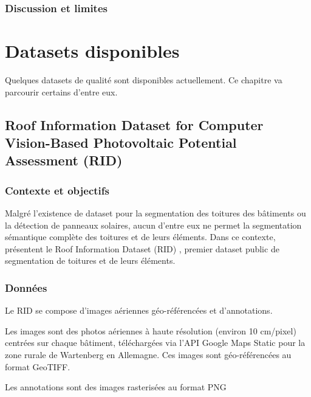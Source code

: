 {{{{\subsubsection{Discussion et limites}


\section{Datasets disponibles}

\par{Quelques datasets de qualité sont disponibles actuellement. Ce chapitre va parcourir certains d'entre eux.}

\subsection{Roof Information Dataset for Computer Vision-Based Photovoltaic Potential Assessment (RID)}
\label{subsec:rid_roof_information_dataset}

\subsubsection{Contexte et objectifs}
\par{Malgré l'existence de dataset pour la segmentation des toitures des bâtiments ou la détection de panneaux solaires, aucun d'entre eux ne permet la segmentation sémantique complète des toitures et de leurs éléments. Dans ce contexte, \citeauthor{krapf_ridroof_2022} présentent le Roof Information Dataset (RID) \cite{krapf_ridroof_2022}, premier dataset public de segmentation de toitures et de leurs éléments.}

\subsubsection{Données}
\par{Le RID se compose d'images aériennes géo-référencées et d'annotations.}
\par{Les images sont des photos aériennes à haute résolution (environ 10 cm/pixel) centrées sur chaque bâtiment, téléchargées via l'API Google Maps Static pour la zone rurale de Wartenberg en Allemagne. Ces images sont géo-référencées au format GeoTIFF.}
\par{Les annotations sont des images rasterisées au format PNG}

}}}}
